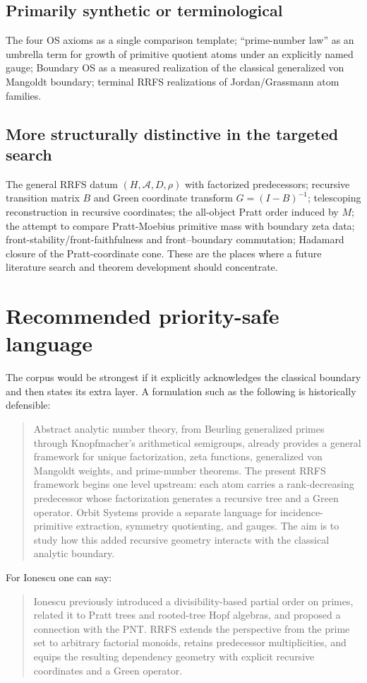 \documentclass[11pt]{article}
\newcommand{\cA}{\mathcal A}
\begin{document}
\subsection{Primarily synthetic or terminological}
The four OS axioms as a single comparison template; ``prime-number law'' as an umbrella term for growth of primitive quotient atoms under an explicitly named gauge; Boundary OS as a measured realization of the classical generalized von Mangoldt boundary; terminal RRFS realizations of Jordan/Grassmann atom families.

\subsection{More structurally distinctive in the targeted search}
The general RRFS datum $(H,\cA,D,\rho)$ with factorized predecessors; recursive transition matrix $B$ and Green coordinate transform $G=(I-B)^{-1}$; telescoping reconstruction in recursive coordinates; the all-object Pratt order induced by $M$; the attempt to compare Pratt-Moebius primitive mass with boundary zeta data; front-stability/front-faithfulness and front--boundary commutation; Hadamard closure of the Pratt-coordinate cone. These are the places where a future literature search and theorem development should concentrate.

\section{Recommended priority-safe language}
The corpus would be strongest if it explicitly acknowledges the classical boundary and then states its extra layer. A formulation such as the following is historically defensible:

\begin{quote}
Abstract analytic number theory, from Beurling generalized primes through Knopfmacher's arithmetical semigroups, already provides a general framework for unique factorization, zeta functions, generalized von Mangoldt weights, and prime-number theorems. The present RRFS framework begins one level upstream: each atom carries a rank-decreasing predecessor whose factorization generates a recursive tree and a Green operator. Orbit Systems provide a separate language for incidence-primitive extraction, symmetry quotienting, and gauges. The aim is to study how this added recursive geometry interacts with the classical analytic boundary.
\end{quote}

For Ionescu one can say:
\begin{quote}
Ionescu previously introduced a divisibility-based partial order on primes, related it to Pratt trees and rooted-tree Hopf algebras, and proposed a connection with the PNT. RRFS extends the perspective from the prime set to arbitrary factorial monoids, retains predecessor multiplicities, and equips the resulting dependency geometry with explicit recursive coordinates and a Green operator.
\end{quote}
\end{document}
